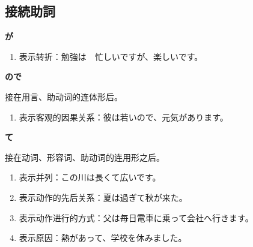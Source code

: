 \subsection{接続助詞}%

{\bf
\noindent が
}

\begin{enumerate}
  \item 表示转折：勉強は　忙しいですが、楽しいです。
\end{enumerate}

{\bf
\noindent ので
}

接在用言、助动词的连体形后。
\begin{enumerate}
  \item 表示客观的因果关系：彼は若いので、元気があります。
\end{enumerate}

{\bf
\noindent て
}

接在动词、形容词、助动词的连用形之后。
\begin{enumerate}
  \item 表示并列：この川は長くて広いです。
  \item 表示动作的先后关系：夏は過ぎて秋が来た。
  \item 表示动作进行的方式：父は毎日電車に乗って会社へ行きます。
  \item 表示原因：熱があって、学校を休みました。
\end{enumerate}
